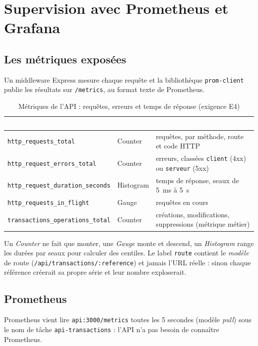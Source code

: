 \chapter{Supervision avec Prometheus et Grafana}\label{chap:supervision}

\section{Les métriques exposées}
Un middleware Express mesure chaque requête et la bibliothèque \texttt{prom-client} publie les
résultats sur \texttt{/metrics}, au format texte de Prometheus.

\begin{table}[H]
\centering\small
\caption{Métriques de l'API : requêtes, erreurs et temps de réponse (exigence E4)}
\begin{tabularx}{\linewidth}{|l|l|X|}
\hline
\rowcolor{bluedark}\textcolor{white}{\textbf{Métrique}} & \textcolor{white}{\textbf{Type}} & \textcolor{white}{\textbf{Ce qu'elle mesure}} \\
\hline
\texttt{http\_requests\_total} & Counter & requêtes, par méthode, route et code HTTP \\
\hline
\texttt{http\_request\_errors\_total} & Counter & erreurs, classées \texttt{client} (4xx) ou \texttt{serveur} (5xx) \\
\hline
\texttt{http\_request\_duration\_seconds} & Histogram & temps de réponse, seaux de 5~ms à 5~s \\
\hline
\texttt{http\_requests\_in\_flight} & Gauge & requêtes en cours \\
\hline
\texttt{transactions\_operations\_total} & Counter & créations, modifications, suppressions (métrique métier) \\
\hline
\end{tabularx}
\end{table}

Un \emph{Counter} ne fait que monter, une \emph{Gauge} monte et descend, un \emph{Histogram} range
les durées par seaux pour calculer des centiles. Le label \texttt{route} contient le \emph{modèle}
de route (\texttt{/api/transactions/:reference}) et jamais l'URL réelle : sinon chaque référence
créerait sa propre série et leur nombre exploserait.

\section{Prometheus}
Prometheus vient lire \texttt{api:3000/metrics} toutes les 5 secondes (modèle \emph{pull}) sous le
nom de tâche \texttt{api-transactions} : l'API n'a pas besoin de connaître Prometheus.

